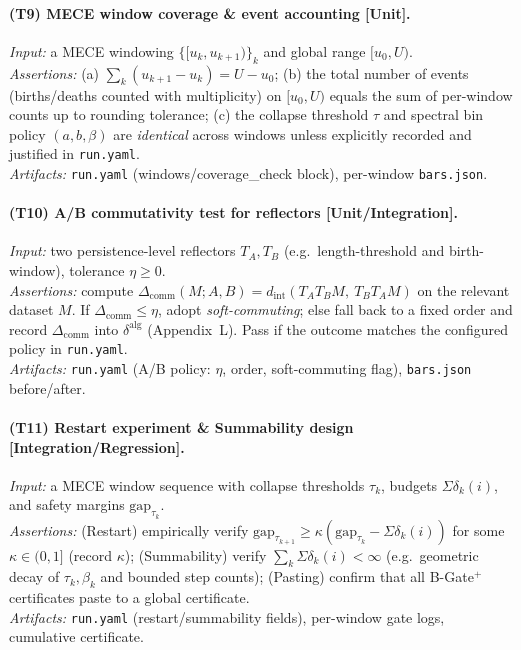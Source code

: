 \documentclass[11pt]{article}
\DeclareRobustCommand{\hyp}{\nobreakdash-}
\numberwithin{equation}{section}
\theoremstyle{definition}
\providecommand{\n}{\unskip\space}
\begin{document}
\paragraph{(T9) MECE window coverage \& event accounting [Unit].}
\emph{Input:} a MECE windowing \(\{[u_k,u_{k+1})\}_k\) and global range \([u_0,U)\).\\\n\emph{Assertions:} (a) \(\sum_k (u_{k+1}-u_k)=U-u_0\); (b) the total number of events (births/deaths counted with multiplicity) on \([u_0,U)\) equals the sum of per\hyp window counts up to rounding tolerance; (c) the collapse threshold \(\tau\) and spectral bin policy \((a,b,\beta)\) are \emph{identical} across windows unless explicitly recorded and justified in \texttt{run.yaml}.\\\n\emph{Artifacts:} \texttt{run.yaml} (windows/coverage\_check block), per\hyp window \texttt{bars.json}.

\paragraph{(T10) A/B commutativity test for reflectors [Unit/Integration].}
\emph{Input:} two persistence\hyp level reflectors \(T_A,T_B\) (e.g.\ length\hyp threshold and birth\hyp window), tolerance \(\eta\ge 0\).\\\n\emph{Assertions:} compute \(\Delta_{\mathrm{comm}}(M;A,B)=d_{\mathrm{int}}(T_A T_B M,\ T_B T_A M)\) on the relevant dataset \(M\). If \(\Delta_{\mathrm{comm}}\le \eta\), adopt \emph{soft\hyp commuting}; else fall back to a fixed order and record \(\Delta_{\mathrm{comm}}\) into \(\delta^{\mathrm{alg}}\) (Appendix~L). Pass if the outcome matches the configured policy in \texttt{run.yaml}.\\\n\emph{Artifacts:} \texttt{run.yaml} (A/B policy: \(\eta\), order, soft\hyp commuting flag), \texttt{bars.json} before/after.

\paragraph{(T11) Restart experiment \& Summability design [Integration/Regression].}
\emph{Input:} a MECE window sequence with collapse thresholds \(\tau_k\), budgets \(\Sigma\delta_k(i)\), and safety margins \(\mathrm{gap}_{\tau_k}\).\\\n\emph{Assertions:} (Restart) empirically verify \(\mathrm{gap}_{\tau_{k+1}}\ge \kappa(\mathrm{gap}_{\tau_k}-\Sigma\delta_k(i))\) for some \(\kappa\in(0,1]\) (record \(\kappa\)); (Summability) verify \(\sum_k \Sigma\delta_k(i)<\infty\) (e.g.\ geometric decay of \(\tau_k,\beta_k\) and bounded step counts); (Pasting) confirm that all B\hyp Gate\(^{+}\) certificates paste to a global certificate.\\\n\emph{Artifacts:} \texttt{run.yaml} (restart/summability fields), per\hyp window gate logs, cumulative certificate.
\end{document}

